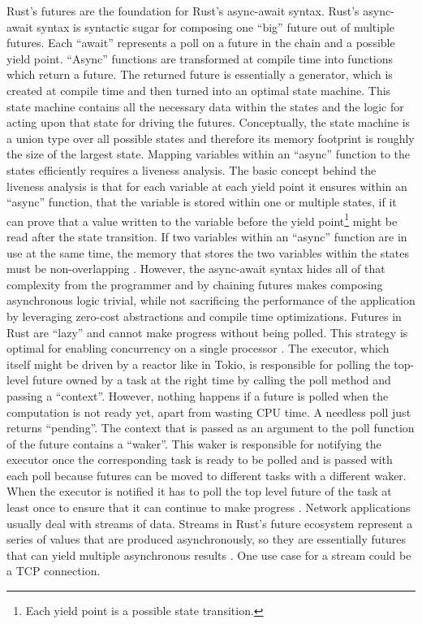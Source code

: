 Rust’s futures are the foundation for Rust’s async-await syntax. Rust’s async-await syntax is syntactic sugar for composing one “big” future out of multiple futures. Each “await” represents a poll on a future in the chain and a possible yield point.  \newline
“Async” functions are transformed at compile time into functions which return a future. The returned future is essentially a generator, which is created at compile time and then turned into an optimal state machine. This state machine contains all the necessary data within the states and the logic for acting upon that state for driving the futures. Conceptually, the state machine is a union type over all possible states and therefore its memory footprint is roughly the size of the largest state. Mapping variables within an “async” function to the states efficiently requires a liveness analysis. \newline
The basic concept behind the liveness analysis is that for each variable at each yield point it ensures within an “async” function, that the variable is stored within one or multiple states, if it can prove that a value written to the variable before the yield point\footnote{Each yield point is a possible state transition.} might be read after the state transition. If two variables within an “async” function are in use at the same time, the memory that stores the two variables within the states must be non-overlapping \cite{mandry:await}. \newline
However, the async-await syntax hides all of that complexity from the programmer and by chaining futures makes composing asynchronous logic trivial, while not sacrificing the performance of the application by leveraging zero-cost abstractions and compile time optimizations. \newline
Futures in Rust are “lazy” and cannot make progress without being polled. This strategy is optimal for enabling concurrency on a single processor \cite{bahe:garbage_collection}.
The executor, which itself might be driven by a reactor like in Tokio, is responsible for polling the top-level future owned by a task at the right time by calling the poll method and passing a “context”. However, nothing happens if a future is polled when the computation is not ready yet, apart from wasting CPU time. A needless poll just returns “pending”. The context that is passed as an argument to the poll function of the future contains a “waker”. This waker is responsible for notifying the executor once the corresponding task is ready to be polled and is passed with each poll because futures can be moved to different tasks with a different waker. When the executor is notified it has to poll the top level future of the task at least once to ensure that it can continue to make progress \cite{rust:asyncbook}.\newline
Network applications usually deal with streams of data. Streams in Rust’s future ecosystem represent a series of values that are produced asynchronously, so they are essentially futures that can yield multiple asynchronous results \cite{man:crate_future}. One use case for a stream could be a TCP connection.

